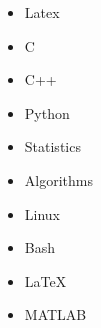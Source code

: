 

\begin{itemize}
  \item Latex
  \item C
  \item C++
  \item Python
  \item Statistics
  \item Algorithms
  \item Linux
  \item Bash
  \item \LaTeX
  \item MATLAB

\end{itemize}
